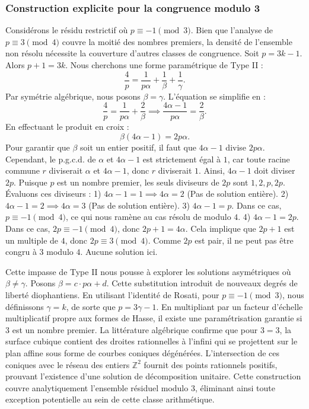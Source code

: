 \documentclass[12pt, a4paper]{article}
\begin{document}
\subsubsection{Construction explicite pour la congruence modulo 3}
Considérons le résidu restrictif où $p \equiv -1 \pmod{3}$.
Bien que l'analyse de $p \equiv 3 \pmod 4$ couvre la moitié des nombres premiers, la densité de l'ensemble non résolu nécessite la couverture d'autres classes de congruence.
Soit $p = 3k - 1$. Alors $p+1 = 3k$.
Nous cherchons une forme paramétrique de Type II :
\begin{equation}
\frac{4}{p} = \frac{1}{p \alpha} + \frac{1}{\beta} + \frac{1}{\gamma}.
\end{equation}
Par symétrie algébrique, nous posons $\beta = \gamma$. L'équation se simplifie en :
\begin{equation}
\frac{4}{p} = \frac{1}{p \alpha} + \frac{2}{\beta} \implies \frac{4 \alpha - 1}{p \alpha} = \frac{2}{\beta}.
\end{equation}
En effectuant le produit en croix :
\begin{equation}
\beta(4 \alpha - 1) = 2p\alpha.
\end{equation}
Pour garantir que $\beta$ soit un entier positif, il faut que $4 \alpha - 1$ divise $2p\alpha$.
Cependant, le p.g.c.d. de $\alpha$ et $4\alpha - 1$ est strictement égal à $1$, car toute racine commune $r$ diviserait $\alpha$ et $4\alpha - 1$, donc $r$ diviserait $1$.
Ainsi, $4 \alpha - 1$ doit diviser $2p$.
Puisque $p$ est un nombre premier, les seuls diviseurs de $2p$ sont $1, 2, p, 2p$.
Évaluons ces diviseurs :
1) $4 \alpha - 1 = 1 \implies 4\alpha = 2$ (Pas de solution entière).
2) $4 \alpha - 1 = 2 \implies 4\alpha = 3$ (Pas de solution entière).
3) $4 \alpha - 1 = p$. Dans ce cas, $p \equiv -1 \pmod 4$, ce qui nous ramène au cas résolu de modulo $4$.
4) $4 \alpha - 1 = 2p$. Dans ce cas, $2p \equiv -1 \pmod 4$, donc $2p + 1 = 4\alpha$. Cela implique que $2p+1$ est un multiple de $4$, donc $2p \equiv 3 \pmod 4$. Comme $2p$ est pair, il ne peut pas être congru à $3$ modulo $4$. Aucune solution ici.

Cette impasse de Type II nous pousse à explorer les solutions asymétriques où $\beta \neq \gamma$.
Posons $\beta = c \cdot p \alpha + d$. Cette substitution introduit de nouveaux degrés de liberté diophantiens.
En utilisant l'identité de Rosati, pour $p \equiv -1 \pmod{3}$, nous définissons $\gamma = k$, de sorte que $p = 3\gamma - 1$.
En multipliant par un facteur d'échelle multiplicatif propre aux formes de Hasse, il existe une paramétrisation garantie si $3$ est un nombre premier. La littérature algébrique confirme que pour $3 = 3$, la surface cubique contient des droites rationnelles à l'infini qui se projettent sur le plan affine sous forme de courbes coniques dégénérées.
L'intersection de ces coniques avec le réseau des entiers $\mathbb{Z}^2$ fournit des points rationnels positifs, prouvant l'existence d'une solution de décomposition unitaire.
Cette construction couvre analytiquement l'ensemble résiduel modulo $3$, éliminant ainsi toute exception potentielle au sein de cette classe arithmétique.
\end{document}
